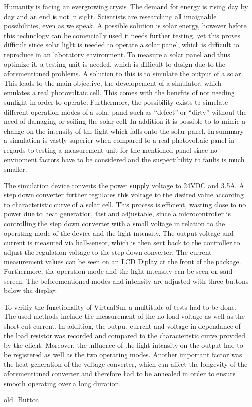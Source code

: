 \documentclass[a4paper]{fhnwreport}
\begin{document}
Humanity is facing an evergrowing crysis. The demand for energy is rising day by day and an end is not in sight. Scientists are researching all imaignable possibilities, even as we speak. A possible solution is solar energy, however before this technology can be comercially used it needs further testing, yet this proves difficult since solar light is needed to operate a solar panel, which is difficult to reproduce in an laboratory environment. To measure a solar panel and thus optimize it, a testing unit is needed, which is difficult to design due to the aforementioned problems. A solution to this is to simulate the output of a solar. This leads to the main objective, the developement of a simulator, which emulates a real photovoltaic cell. This comes with the benefits of not needing sunlight in order to operate. Furthermore, the possibility exists to simulate different operation modes of a solar panel such as ``defect'' or ``dirty'' without the need of damaging or soiling the solar cell. In addition it is possible to to mimic a change on the intensity of the light which falls onto the solar panel. In summary a simulation is vastly superior when compared to a real photovoltaic panel in regards to testing a measurement unit for the mentioned panel
since no enviroment factors have to be considered and the suspectibility to faults is much smaller. 

The simulation device converts the power supply voltage to 24VDC and 3.5A. A step down converter further regulates this voltage to the desired value according to characteristic curve of a solar cell. This process is efficient, wasting close to no power due to heat generation, fast and adjustable, since a microcontroller is controlling the step down converter with a small voltage in relation to the operating mode of the device and the light intensity. The output voltage and current is measured via hall-sensor, which is then sent back to the controller to adjust the regulation voltage to the step down converter. The current measurement values can be seen on an LCD Diplay at the front of the package. Furthermore, the operation mode and the light intensity can be seen on said screen. The beforementioned modes and intensity are adjusted with three buttons below the display. 

To verifiy the functionality of VirtualSun a multitude of tests had to be done. The used methods include the measurement of the no load voltage as well as the short cut current. In addition, the output current and voltage in dependance of the load resistor was recorded and compared to the characteristic curve provided by the client.  Moreover, the influence of the light intensity on the output had to be registered as well as the two operating modes. Another important factor was the heat generation of the voltage converter, which can affect the longevity of the aforementioned converter and therefore had to be annealed in order to ensure smooth operating over a long duration. 

 
{old\_Button}
\end{document}
